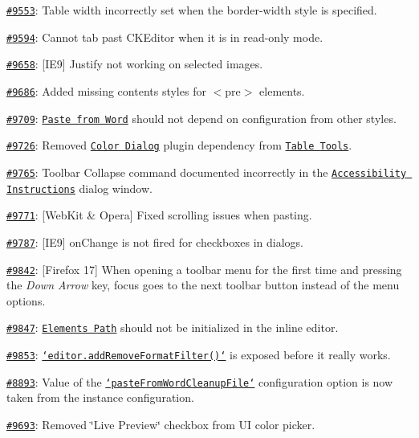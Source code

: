 \begin{DoxyItemize}
\item \href{http://dev.ckeditor.com/ticket/9553}{\tt \#9553}\-: Table width incorrectly set when the {\ttfamily border-\/width} style is specified.
\item \href{http://dev.ckeditor.com/ticket/9594}{\tt \#9594}\-: Cannot tab past C\-K\-Editor when it is in read-\/only mode.
\item \href{http://dev.ckeditor.com/ticket/9658}{\tt \#9658}\-: \mbox{[}I\-E9\mbox{]} Justify not working on selected images.
\item \href{http://dev.ckeditor.com/ticket/9686}{\tt \#9686}\-: Added missing contents styles for {\ttfamily $<$pre$>$} elements.
\item \href{http://dev.ckeditor.com/ticket/9709}{\tt \#9709}\-: \href{http://ckeditor.com/addon/pastefromword}{\tt Paste from Word} should not depend on configuration from other styles.
\item \href{http://dev.ckeditor.com/ticket/9726}{\tt \#9726}\-: Removed \href{http://ckeditor.com/addon/colordialog}{\tt Color Dialog} plugin dependency from \href{http://ckeditor.com/addon/tabletools}{\tt Table Tools}.
\item \href{http://dev.ckeditor.com/ticket/9765}{\tt \#9765}\-: Toolbar Collapse command documented incorrectly in the \href{http://ckeditor.com/addon/a11yhelp}{\tt Accessibility Instructions} dialog window.
\item \href{http://dev.ckeditor.com/ticket/9771}{\tt \#9771}\-: \mbox{[}Web\-Kit \& Opera\mbox{]} Fixed scrolling issues when pasting.
\item \href{http://dev.ckeditor.com/ticket/9787}{\tt \#9787}\-: \mbox{[}I\-E9\mbox{]} {\ttfamily on\-Change} is not fired for checkboxes in dialogs.
\item \href{http://dev.ckeditor.com/ticket/9842}{\tt \#9842}\-: \mbox{[}Firefox 17\mbox{]} When opening a toolbar menu for the first time and pressing the {\itshape Down Arrow} key, focus goes to the next toolbar button instead of the menu options.
\item \href{http://dev.ckeditor.com/ticket/9847}{\tt \#9847}\-: \href{http://ckeditor.com/addon/elementspath}{\tt Elements Path} should not be initialized in the inline editor.
\item \href{http://dev.ckeditor.com/ticket/9853}{\tt \#9853}\-: \href{http://docs.ckeditor.com/#!/api/CKEDITOR.editor-method-addRemoveFormatFilter}{\tt `editor.add\-Remove\-Format\-Filter()`} is exposed before it really works.
\item \href{http://dev.ckeditor.com/ticket/8893}{\tt \#8893}\-: Value of the \href{http://docs.ckeditor.com/#!/api/CKEDITOR.config-cfg-pasteFromWordCleanupFile}{\tt `paste\-From\-Word\-Cleanup\-File`} configuration option is now taken from the instance configuration.
\item \href{http://dev.ckeditor.com/ticket/9693}{\tt \#9693}\-: Removed \char`\"{}\-Live Preview\char`\"{} checkbox from U\-I color picker.
\end{DoxyItemize}

